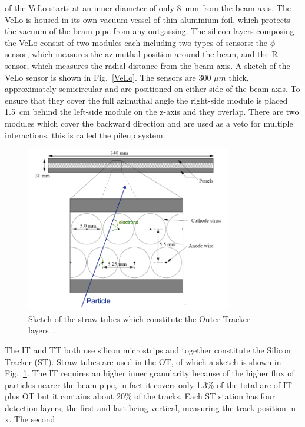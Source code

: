 of the VeLo starts at an inner diameter of only 8~mm from the beam axis. The VeLo is housed in its own
vacuum vessel of thin aluminium foil, which protects the vacuum of the beam pipe from any outgassing. 
The silicon layers composing the VeLo consist of two modules each including two types of sensors:
the $\phi$-sensor, which measures the azimuthal position around the beam, and the R-sensor, which measures
the radial distance from the beam axis. A sketch of the VeLo sensor is shown in Fig.~\ref{VeLo}. The sensors
are 300 $\mu m$ thick, approximately semicircular and are positioned on either side of the beam axis.
To ensure that they cover the full azimuthal angle the right-side module is placed 1.5~cm behind the left-side
module on the z-axis and they overlap. There are two modules which cover the backward direction
and are used as a veto for multiple interactions, this is called the pileup system.
%
\begin{center}
\begin{figure}[h!]
\centering 
\includegraphics[width=0.8\textwidth]{Detector/figs/straw_tubes.png}
\caption{Sketch of the straw tubes which constitute the Outer Tracker layers~\cite{Alves:2008zz}.}
\label{fig:straw:tubes}
\end{figure}
\end{center}
%
The IT and TT both use silicon microstrips and together constitute the Silicon Tracker (ST). Straw tubes are used 
in the OT, of which a sketch is shown in Fig.~\ref{fig:straw:tubes}. The IT requires an higher inner granularity
because of the higher flux of particles nearer the beam pipe, in fact it covers only 1.3\% of the total
are of IT plus OT but it contains about 20\% of the tracks. Each ST station has four detection layers,
the first and last being vertical, measuring the track position in x. The second 
